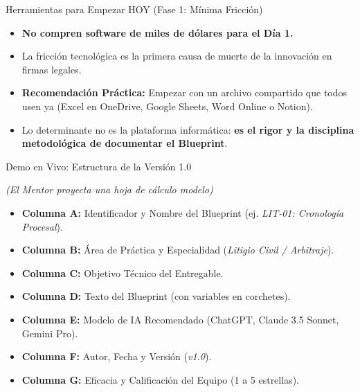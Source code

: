 \documentclass[aspectratio=169]{beamer}
\begin{document}
\begin{frame}{Herramientas para Empezar HOY (Fase 1: Mínima Fricción)}

\begin{itemize}
  \item \textbf{No compren software de miles de dólares para el Día 1.}
  \item La fricción tecnológica es la primera causa de muerte de la innovación en firmas legales.
  \item \textbf{Recomendación Práctica:} Empezar con un archivo compartido que todos usen ya (Excel en OneDrive, Google Sheets, Word Online o Notion).
  \item Lo determinante no es la plataforma informática: \textbf{es el rigor y la disciplina metodológica de documentar el Blueprint}.
\end{itemize}
\end{frame}

\begin{frame}{Demo en Vivo: Estructura de la Versión 1.0}

\textit{(El Mentor proyecta una hoja de cálculo modelo)}
\begin{itemize}
  \item \textbf{Columna A:} Identificador y Nombre del Blueprint (ej. \textit{LIT-01: Cronología Procesal}).
  \item \textbf{Columna B:} Área de Práctica y Especialidad (\textit{Litigio Civil / Arbitraje}).
  \item \textbf{Columna C:} Objetivo Técnico del Entregable.
  \item \textbf{Columna D:} Texto del Blueprint (con variables en corchetes).
  \item \textbf{Columna E:} Modelo de IA Recomendado (ChatGPT, Claude 3.5 Sonnet, Gemini Pro).
  \item \textbf{Columna F:} Autor, Fecha y Versión (\textit{v1.0}).
  \item \textbf{Columna G:} Eficacia y Calificación del Equipo (1 a 5 estrellas).
\end{itemize}
\end{frame}
\end{document}
